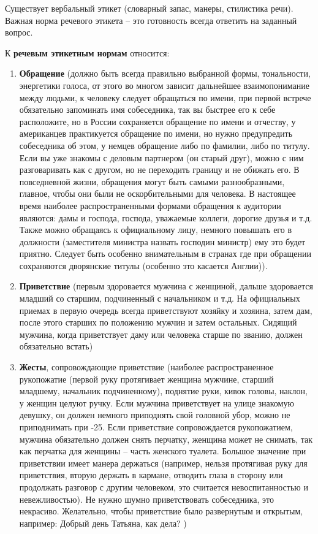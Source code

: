 \documentclass[a4paper,14pt]{extarticle}
\begin{document}
Существует вербальный этикет (словарный запас, манеры, стилистика речи). Важная норма речевого этикета – это готовность всегда ответить на заданный вопрос.

К \textbf{речевым этикетным нормам} относится:

\begin{enumerate}
    \item \textbf{Обращение} (должно быть всегда правильно выбранной формы, тональности, энергетики голоса, от этого во многом зависит дальнейшее взаимопонимание между людьми, к человеку следует обращаться по имени, при первой встрече обязательно запоминать имя собеседника, так вы быстрее его к себе расположите, но в России сохраняется обращение по имени и отчеству, у американцев практикуется обращение по имени, но нужно предупредить собеседника об этом, у немцев обращение либо по фамилии, либо по титулу. Если вы уже знакомы с деловым партнером (он старый друг), можно с ним разговаривать как с другом, но не переходить границу и не обижать его. В повседневной жизни, обращения могут быть самыми разнообразными, главное, чтобы они были не оскорбительными для человека. В настоящее время наиболее распространенными формами обращения к аудитории являются: дамы и господа, господа, уважаемые коллеги, дорогие друзья и т.д. Также можно обращаясь к официальному лицу, немного повышать его в должности (заместителя министра назвать господин министр) ему это будет приятно. Следует быть особенно внимательным в странах где при обращении сохраняются дворянские титулы (особенно это касается Англии)).
    \item \textbf{Приветствие} (первым здоровается мужчина с женщиной, дальше здоровается младший со старшим, подчиненный с начальником и т.д. На официальных приемах в первую очередь всегда приветствуют хозяйку и хозяина, затем дам, после этого старших по положению мужчин и затем остальных. Сидящий мужчина, когда приветствует даму или человека старше по званию, должен обязательно встать)
    \item \textbf{Жесты}, сопровождающие приветствие (наиболее распространенное рукопожатие (первой руку протягивает женщина мужчине, старший младшему, начальник подчиненному), поднятие руки, кивок головы, наклон, у женщин целуют ручку. Если мужчина приветствует на улице знакомую девушку, он должен немного приподнять свой головной убор, можно не приподнимать при -25. Если приветствие сопровождается рукопожатием, мужчина обязательно должен снять перчатку, женщина может не снимать, так как перчатка для женщины – часть женского туалета. Большое значение при приветствии имеет манера держаться (например, нельзя протягивая руку для приветствия, вторую держать в кармане, отводить глаза в сторону или продолжать разговор с другим человеком, это считается невоспитанностью и невежливостью). Не нужно шумно приветствовать собеседника, это некрасиво. Желательно, чтобы приветствие было развернутым и открытым, например: Добрый день Татьяна, как дела? )

\end{enumerate}
\end{document}
